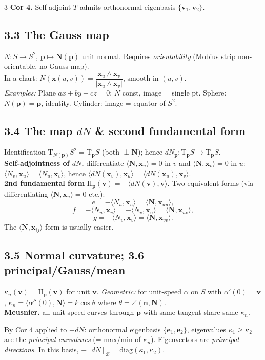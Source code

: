 \documentclass[9pt,a4paper]{extarticle}
\newcommand{\thm}[1]{\textbf{#1.}}
\newcommand{\T}{\mathrm{T}}
\newcommand{\N}{\mathbf{N}}
\newcommand{\bn}{\mathbf{n}}
\newcommand{\bx}{\mathbf{x}}
\newcommand{\bp}{\mathbf{p}}
\newcommand{\bv}{\mathbf{v}}
\newcommand{\xu}{\bx_u}
\newcommand{\xv}{\bx_v}
\newcommand{\xuu}{\bx_{uu}}
\newcommand{\xuv}{\bx_{uv}}
\newcommand{\xvv}{\bx_{vv}}
\newcommand{\inner}[2]{\langle #1, #2 \rangle}
\begin{document}
\begin{multicols*}{3}
\thm{Cor 4} Self-adjoint $T$ admits orthonormal eigenbasis $\{\bv_1,\bv_2\}$.

\subsection{3.3 The Gauss map}
$N\!:\!S\!\to\!S^2$, $\bp\mapsto\N(\bp)$ unit normal. Requires \emph{orientability} (Mobius strip non-orientable, no Gauss map).\\
In a chart: $N(\bx(u,v))=\dfrac{\xu\wedge\xv}{|\xu\wedge\xv|}$, smooth in $(u,v)$.\\
\emph{Examples:} Plane $ax+by+cz=0$: $N$ const, image = single pt. Sphere: $N(\bp)=\bp$, identity. Cylinder: image = equator of $S^2$.

\subsection{3.4 The map $dN$ \& second fundamental form}
Identification $\T_{N(\bp)}S^2=\T_\bp S$ (both $\perp\N$); hence $dN_\bp:\T_\bp S\to\T_\bp S$.\\
\thm{Self-adjointness of $dN$} differentiate $\inner{\N}{\xu}=0$ in $v$ and $\inner{\N}{\xv}=0$ in $u$: $\inner{N_v}{\xu}=\inner{N_u}{\xv}$, hence $\inner{dN(\xv)}{\xu}=\inner{dN(\xu)}{\xv}$.\\
\textbf{2nd fundamental form} $\mathrm{II}_\bp(\bv)=-\inner{dN(\bv)}{\bv}$. Two equivalent forms (via differentiating $\inner{\N}{\xu}=0$ etc.):
\[
e=-\inner{N_u}{\xu}=\inner{\N}{\xuu},
\]
\[
f=-\inner{N_u}{\xv}=-\inner{N_v}{\xu}=\inner{\N}{\xuv},
\]
\[
g=-\inner{N_v}{\xv}=\inner{\N}{\xvv}.
\]
The $\inner{\N}{\bx_{ij}}$ form is usually easier.

\subsection{3.5 Normal curvature; 3.6 principal/Gauss/mean}
$\kappa_n(\bv)=\mathrm{II}_\bp(\bv)$ for unit $\bv$. \emph{Geometric:} for unit-speed $\alpha$ on $S$ with $\alpha'(0)=\bv$, $\kappa_n=\inner{\alpha''(0)}{\N}=k\cos\theta$ where $\theta=\angle(\bn,\N)$.\\
\thm{Meusnier} all unit-speed curves through $\bp$ with same tangent share same $\kappa_n$.

By Cor 4 applied to $-dN$: orthonormal eigenbasis $\{\mathbf{e}_1,\mathbf{e}_2\}$, eigenvalues $\kappa_1\!\ge\!\kappa_2$ are the \emph{principal curvatures} (= max/min of $\kappa_n$). Eigenvectors are \emph{principal directions}. In this basis, $-[dN]_{\mathcal{B}}=\mathrm{diag}(\kappa_1,\kappa_2)$.


\end{multicols*}
\end{document}
